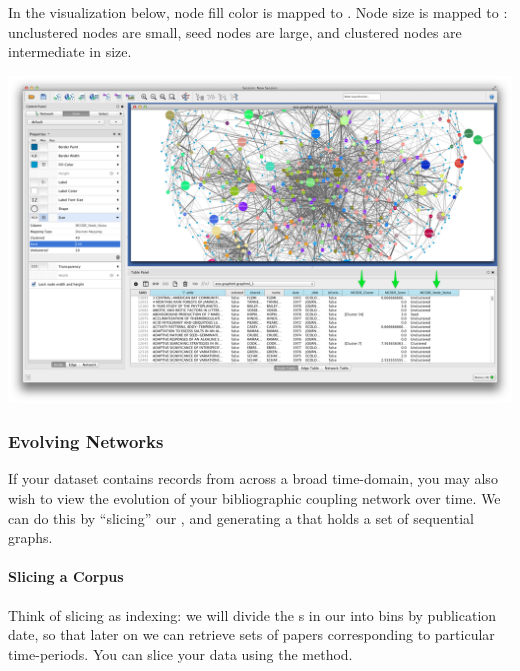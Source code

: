 \documentclass[letterpaper,10pt,english]{sphinxmanual}
\begin{document}
In the visualization below, node fill color is mapped to . Node size is
mapped to : unclustered nodes are small, seed nodes are large, and
clustered nodes are intermediate in size.

{\hfill\includegraphics{cyto.10.png}\hfill}


\subsubsection{Evolving Networks}
\label{tutorial.bibliocoupling:evolving-networks}
If your dataset contains records from across a broad time-domain, you may also wish to
view the evolution of your bibliographic coupling network over time. We can do this
by ``slicing'' our {\hyperref[tethne.classes.corpus:tethne.classes.corpus.Corpus]{}}, and generating a {\hyperref[tethne.classes.graphcollection:tethne.classes.graphcollection.GraphCollection]{}} that holds
a set of sequential graphs.


\paragraph{Slicing a Corpus}
\label{tutorial.bibliocoupling:slicing-a-corpus}\label{tutorial.bibliocoupling:id2}
Think of slicing as indexing: we will divide the {\hyperref[tethne.classes.paper:tethne.classes.paper.Paper]{}}s in our {\hyperref[tethne.classes.corpus:tethne.classes.corpus.Corpus]{}}
into bins by publication date, so that later on we can retrieve sets of papers
corresponding to particular time-periods. You can slice your data using the
 method.
\end{document}
